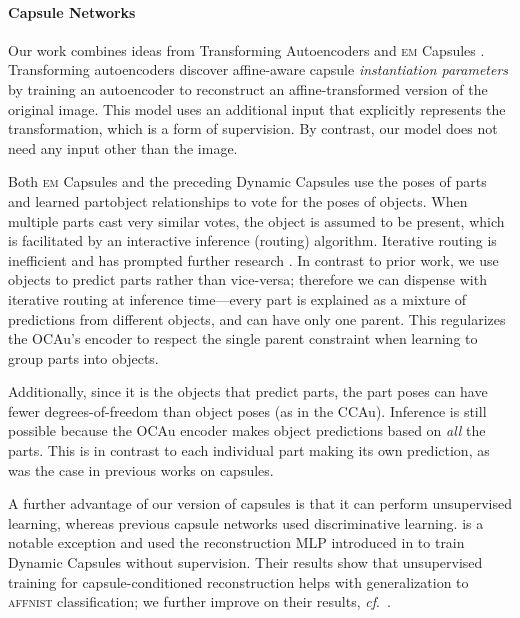 \documentclass{article}
\begin{document}
\paragraph{Capsule Networks}
Our work combines ideas from Transforming Autoencoders \citep{Hinton2011tae} and \textsc{em} Capsules \citep{Hinton2018capsule}.
Transforming autoencoders discover affine-aware capsule \textit{instantiation parameters} by training an autoencoder to reconstruct an affine-transformed version of the original image.
This model uses an additional input that explicitly represents the transformation, which is a form of supervision.
By contrast, our model does not need any input other than the image.

Both \textsc{em} Capsules and the preceding Dynamic Capsules \citep{Sabour2017capsule} use the poses of parts and learned partobject relationships to vote for the poses of objects. When multiple parts cast very similar votes, the object is assumed to be present, which is facilitated by an interactive inference (routing) algorithm. 
Iterative routing is inefficient and has prompted further research \citep{Wang2018optimization,Zhang2018fast,Li2018encapsule}.
In contrast to prior work, we use objects to predict parts rather than vice-versa; therefore we can dispense with iterative routing at inference time---every part is explained as a mixture of predictions from different objects, and can have only one parent.
This regularizes the \gls{OCAu}'s encoder to respect the single parent constraint when learning to group parts into objects.

Additionally, since it is the objects that predict parts, the part poses can have fewer degrees-of-freedom than object poses (as in the \gls{CCAu}). 
Inference is still possible because the \gls{OCAu} encoder makes object predictions based on {\it all} the parts.
This is in contrast to each individual part making its own prediction, as was the case in previous works on capsules.

A further advantage of our version of capsules is that it can perform unsupervised learning, whereas previous capsule networks used discriminative learning. 
\cite{Rawlinson2018sparsecaps} is a notable exception and used the reconstruction \gls{MLP} introduced in \cite{Sabour2017capsule} to train Dynamic Capsules without supervision.
Their results show that unsupervised training for capsule-conditioned reconstruction helps with generalization to \textsc{affnist} classification; we further improve on their results, \textit{cf}.\ .
\end{document}

